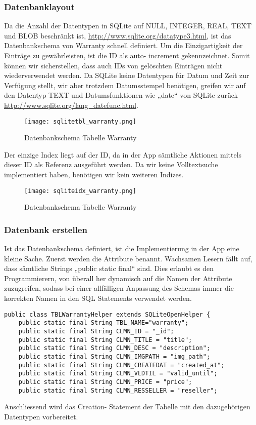 
\subsubsection{Datenbanklayout}
Da die Anzahl der Datentypen in SQLite auf NULL, INTEGER, REAL, TEXT und BLOB beschränkt ist, \url{http://www.sqlite.org/datatype3.html}, ist das Datenbankschema von Warranty schnell definiert.
\newline
Um die Einzigartigkeit der Einträge zu gewährleisten, ist die ID als auto- increment gekennzeichnet. Somit können wir sicherstellen, dass auch IDs von gelöschten Einträgen nicht wiederverwendet werden. 
\newline
Da SQLite keine Datentypen für Datum und Zeit zur Verfügung stellt, wir aber trotzdem Datumsstempel benötigen, greifen wir auf den Datentyp TEXT und Datumsfunktionen wie „date“ von SQLite zurück \url{http://www.sqlite.org/lang_datefunc.html}.
\newline
\begin{figure}[h]
\centering
\texttt{[image: sqlitetbl\_warranty.png]} \\
\caption{Datenbankschema Tabelle Warranty}
\end{figure}

Der einzige Index liegt auf der ID, da in der App sämtliche Aktionen mittels dieser ID als Referenz ausgeführt werden. Da wir keine Volltextsuche implementiert haben, benötigen wir kein weiteren Indizes.
\begin{figure}[h]
\centering
\texttt{[image: sqliteidx\_warranty.png]} \\
\caption{Datenbankschema Tabelle Warranty}
\end{figure}

\subsubsection{Datenbank erstellen}
Ist das Datenbankschema definiert, ist die Implementierung in der App eine kleine Sache. Zuerst werden die Attribute benannt. Wachsamen Lesern fällt auf, dass sämtliche Strings „public static final“ sind. Dies erlaubt es den Programmierern, von überall her dynamisch auf die Namen der Attribute zuzugreifen, sodass bei einer allfälligen Anpassung des Schemas immer die korrekten Namen in den SQL Statements verwendet werden.
\newline

\begin{lstlisting}[caption=Attributdeklaration,captionpos=b,lang=java]
public class TBLWarrantyHelper extends SQLiteOpenHelper {
	public static final String TBL_NAME="warranty";
	public static final String CLMN_ID = "_id";
	public static final String CLMN_TITLE = "title";
	public static final String CLMN_DESC = "description";
	public static final String CLMN_IMGPATH = "img_path";
	public static final String CLMN_CREATEDAT = "created_at";
	public static final String CLMN_VLDTIL = "valid_until";
	public static final String CLMN_PRICE = "price";
	public static final String CLMN_RESSELLER = "reseller";
\end{lstlisting}
Anschliessend wird das Creation- Statement der Tabelle mit den dazugehörigen Datentypen vorbereitet.

